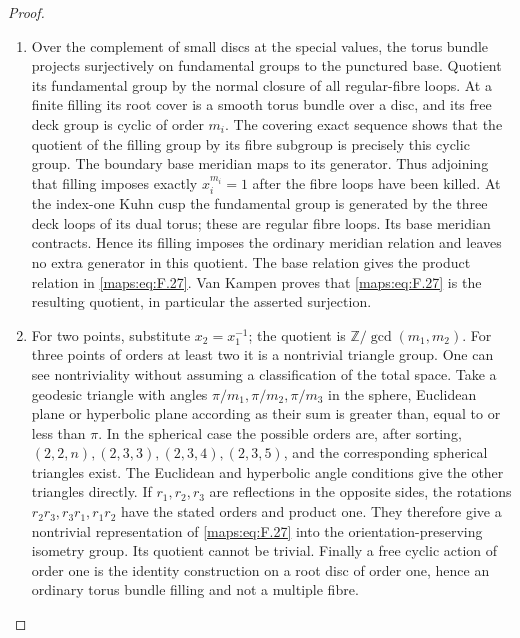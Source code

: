 \documentclass[11pt,a4paper]{article}
\theoremstyle{definition}
\begin{document}
\begin{proof}
\begin{enumerate}[label=\arabic*.]
\item Over the complement of small discs at the special values,
the torus bundle projects surjectively on fundamental groups
to the punctured base.  Quotient its fundamental group by the
normal closure of all regular-fibre loops.  At a finite
filling its root cover is a smooth torus bundle over a disc,
and its free deck group is cyclic of order $m_i$.
The covering exact sequence shows that the quotient of the
filling group by its fibre subgroup is precisely this cyclic
group.  The boundary base meridian maps to its generator.
Thus adjoining that filling imposes exactly
$x_i^{m_i}=1$ after the fibre loops have been killed.
At the index-one Kuhn cusp the fundamental group is generated
by the three deck loops of its dual torus; these are regular
fibre loops.  Its base meridian contracts.  Hence its filling
imposes the ordinary meridian relation and leaves no extra
generator in this quotient.  The base relation gives the
product relation in \eqref{maps:eq:F.27}.  Van Kampen proves that \eqref{maps:eq:F.27} is
the resulting quotient, in particular the asserted surjection.

\item For two points, substitute $x_2=x_1^{-1}$; the quotient is
$\mathbb Z/\gcd(m_1,m_2)$.
For three points of orders at least two it is a nontrivial
triangle group.  One can see nontriviality without assuming
a classification of the total space.  Take a geodesic triangle
with angles $\pi/m_1,\pi/m_2,\pi/m_3$ in the sphere, Euclidean
plane or hyperbolic plane according as their sum is greater
than, equal to or less than $\pi$.
In the spherical case the possible orders are, after sorting,
$(2,2,n),(2,3,3),(2,3,4),(2,3,5)$, and the corresponding
spherical triangles exist.  The Euclidean and hyperbolic
angle conditions give the other triangles directly.
If $r_1,r_2,r_3$ are reflections in the opposite sides,
the rotations $r_2r_3,r_3r_1,r_1r_2$ have the stated
orders and product one.  They therefore give a nontrivial
representation of \eqref{maps:eq:F.27} into the orientation-preserving
isometry group.  Its quotient cannot be trivial.
Finally a free cyclic action of order one is the identity
construction on a root disc of order one, hence an ordinary
torus bundle filling and not a multiple fibre.

\end{enumerate}
\end{proof}
\end{document}
